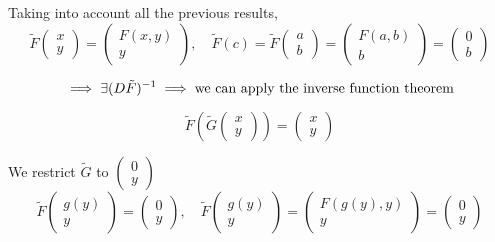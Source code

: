 \documentclass[11pt]{article}
\begin{document}
Taking into account all the previous results, 
\[
\tilde{F} \begin{pmatrix}
    x \\
    y
\end{pmatrix} = \begin{pmatrix}
    F(x,y) \\
    y
\end{pmatrix}, \quad \tilde{F}(c) = \tilde{F} \begin{pmatrix}
    a \\
    b
\end{pmatrix} = \begin{pmatrix}
    F(a,b) \\
    b
\end{pmatrix} = \begin{pmatrix}
    0 \\
    b
\end{pmatrix}
\]


\[
\implies \exists \space (D \tilde{F})^{-1} \implies \text{we can apply the inverse function theorem}
\]

\[
\tilde{F}\left( \tilde{G} \begin{pmatrix}
    x \\
    y
\end{pmatrix} \right) = \begin{pmatrix}
    x \\
    y
\end{pmatrix}
\]

We restrict $\tilde{G}$ to $\begin{pmatrix}
    0 \\
    y
\end{pmatrix}$
\[
\tilde{F} \begin{pmatrix}
    g(y) \\
    y
\end{pmatrix} = \begin{pmatrix}
    0 \\
    y
\end{pmatrix}, \quad \tilde{F} \begin{pmatrix}
    g(y) \\
    y
\end{pmatrix} = \begin{pmatrix}
    F(g(y),y) \\
    y
\end{pmatrix} = \begin{pmatrix}
    0 \\
    y
\end{pmatrix}
\]
\end{document}
